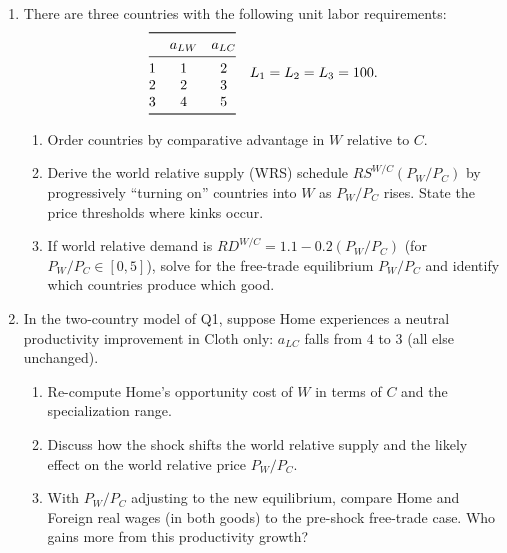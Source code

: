 \documentclass[11pt]{article}
\begin{document}
\begin{enumerate}[leftmargin=*, resume]
\item 
There are three countries with the following unit labor requirements:
\[
\begin{array}{@{}lcc@{}}
\toprule
 & a_{LW} & a_{LC} \\
\midrule
1 & 1 & 2 \\
2 & 2 & 3 \\
3 & 4 & 5 \\
\bottomrule
\end{array}
\quad L_1=L_2=L_3=100.
\]
\begin{enumerate}
\item Order countries by comparative advantage in $W$ relative to $C$.
\item Derive the world relative supply (WRS) schedule $RS^{W/C}(P_W/P_C)$ by progressively ``turning on'' countries into $W$ as $P_W/P_C$ rises. State the price thresholds where kinks occur.
\item If world relative demand is $RD^{W/C}=1.1 - 0.2(P_W/P_C)$ (for $P_W/P_C\in[0,5]$), solve for the free-trade equilibrium $P_W/P_C$ and identify which countries produce which good.
\end{enumerate}

\item
In the two-country model of Q1, suppose Home experiences a neutral productivity improvement in Cloth only: $a_{LC}$ falls from $4$ to $3$ (all else unchanged).
\begin{enumerate}
\item Re-compute Home’s opportunity cost of $W$ in terms of $C$ and the specialization range.
\item Discuss how the shock shifts the world relative supply and the likely effect on the world relative price $P_W/P_C$.
\item With $P_W/P_C$ adjusting to the new equilibrium, compare Home and Foreign real wages (in both goods) to the pre-shock free-trade case. Who gains more from this productivity growth?
\end{enumerate}
\end{enumerate}
\end{document}
